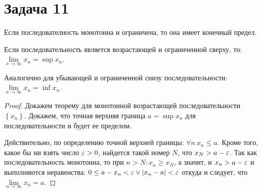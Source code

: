 \section*{Задача 11}

\begin{ther}
    Если последователность монотонна и ограничена, то она имеет конечный предел.
\end{ther}

\begin{ther}

    Если последовательность является возрастающей и ограниченной сверху, то: $\lim\limits_{x \to \infty} x_n = \sup {x_n}$.

    Аналогично для убывающей и ограниченной снизу последовательности: $\lim\limits_{x \to \infty} x_n = \inf {x_n}$.
\end{ther}

\begin{proof}
    Докажем теорему для монотонной возрастающей последовательности $\left\{x_n\right\}$. Докажем, что точная верхняя граница $a = \sup{x_n}$ для последовательности и будет ее пределом.

    Действительно, по определению точной верхней границы: 
    $\forall n\ x_n \leq a$.
    Кроме того, какое бы ни взять число $\varepsilon > 0$, найдется такой номер $N$, что $x_N > a - \varepsilon$.
    Так как последовательность монотонна, то при $n > N: x_n \geq x_N$, а значит, и $x_n > a - \varepsilon$ и выполняются неравенства: $0 \leq a - x_n < \varepsilon \vee \left | x_n - a \right | <\varepsilon$
     откуда и следует, что $\lim\limits_{n \to \infty} x_n = a$.
\end{proof}
